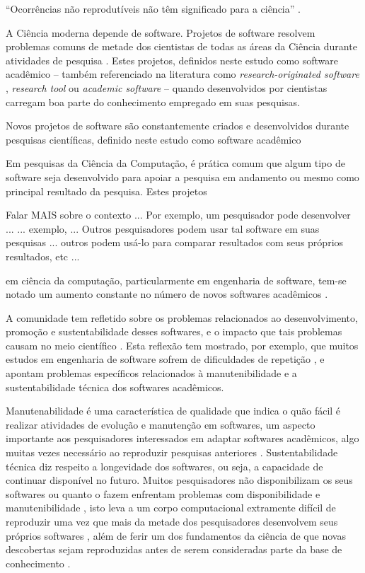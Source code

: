 {``Ocorrências não reprodutíveis não têm significado para a ciência'' \cite{popper2004logica}.}

A Ciência moderna depende de software. Projetos de software resolvem
problemas comuns de metade dos cientistas de todas as áreas da Ciência durante
atividades de pesquisa \cite{wilson2014best}. Estes projetos, definidos neste
estudo como software acadêmico -- também referenciado na literatura como {\it
research-originated software} \cite{kon2011free}, {\it research tool}
\cite{portillo2012tools} ou {\it academic software} \cite{allen2017engineering}
-- quando desenvolvidos por cientistas carregam boa parte do conhecimento
empregado em suas pesquisas.

Novos projetos de software são constantemente criados e desenvolvidos durante
pesquisas científicas, definido neste estudo como software acadêmico

Em pesquisas da Ciência da Computação, é prática comum que
algum tipo de software seja desenvolvido para apoiar a pesquisa em andamento ou
mesmo como principal resultado da pesquisa. Estes projetos 

Falar MAIS sobre o contexto   ...
Por exemplo, um pesquisador pode desenvolver ...  ... exemplo,  ... Outros
pesquisadores podem usar tal software em suas pesquisas ... outros podem usá-lo
para comparar resultados com seus próprios resultados, etc ...

em ciência da computação,
particularmente em engenharia de software, tem-se notado um aumento constante
no número de novos softwares acadêmicos \cite{allen2017engineering}.

A comunidade tem refletido sobre os problemas relacionados ao
desenvolvimento, promoção e sustentabilidade desses softwares, e o
impacto que tais problemas causam no meio científico \cite{allen2017engineering}. Esta
reflexão tem mostrado, por exemplo, que muitos estudos em engenharia de
software sofrem de dificuldades de repetição \cite{tang2016worthiness}, e apontam
problemas específicos relacionados à manutenibilidade e a sustentabilidade
técnica dos softwares acadêmicos.

Manutenabilidade é uma característica de qualidade que indica o quão fácil é
realizar atividades de evolução e manutenção em softwares, um aspecto
importante aos pesquisadores interessados em adaptar softwares acadêmicos, algo
muitas vezes necessário ao reproduzir pesquisas anteriores \cite{peng2011reproducible}.
Sustentabilidade técnica diz respeito a longevidade dos softwares, ou seja, a
capacidade de continuar disponível no futuro. Muitos pesquisadores não
disponibilizam os seus softwares \cite{robles2010replicating,
amann2015software} ou quanto o fazem enfrentam problemas com disponibilidade e
manutenibilidade \cite{prlic2012ten}, isto leva a um corpo computacional
extramente difícil de reproduzir uma vez que mais da metade dos pesquisadores
desenvolvem seus próprios softwares \cite{hettrick2014uk}, além de ferir um dos
fundamentos da ciência de que novas descobertas sejam reproduzidas antes de
serem consideradas parte da base de conhecimento \cite{stodden2009enabling}.


